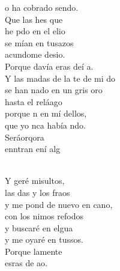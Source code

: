 \documentclass[12pt]{article}
\begin{document}
\begin{multicols*}{2}
\begin{cancion}
	o ha cobrado sendo.\\
	Que las hes que \\
	he pdo en el elio\\
	se mían en tusazos\\
	acundome desio. \\
	Porque davía eras deí a.\\
\jump
	Y las madas de la te de mi do\\
	se han nado en un gris oro\\
	hasta el reláago\\
	porque n en mí dellos,\\
	que yo nca había ndo.\\
	Seráorqora \\
	enntran ení alg\\\jump\\
	\begin{chorus}%
	Y geré misultos,\\
	las das y los fraos\\
	y me pond de nuevo en cano, \\
	con los nimos refodos\\
	y  buscaré en elgua\\
	y me oyaré en tussos.\\
	Porque lamente   \\
	esras de  ao.\\
	\end{chorus}%
	\jump\\
\end{cancion}%


\end{multicols*}
\end{document}
